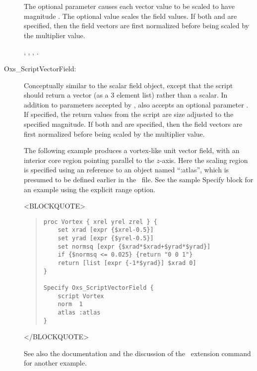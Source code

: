 \begin{description}
   The optional  parameter causes each vector value to be
   scaled to have magnitude .  The optional
    value scales the field values.  If both
    and  are specified, then the field vectors
   are first normalized before being scaled by the multiplier value.

   \begin{ExampleMifs}
     , ,
     , .
   \end{ExampleMifs}

\item[Oxs\_ScriptVectorField:\label{item:ScriptVectorField}]
%
Conceptually similar to the
 scalar
field object,
except that the script should return a vector (as a 3 element list)
rather than a scalar.  In addition to parameters accepted by
,  also accepts
an optional parameter .  If specified, the return
values from the script are size adjusted to the specified magnitude.
If both  and  are specified, then
the field vectors are first normalized before being scaled by the
multiplier value.

The following example produces a vortex-like unit vector field, with
an interior core region pointing parallel to the $z$-axis.  Here the
scaling region is specified using an  reference to an
object named ``:atlas'', which is presumed to be defined earlier in
the \MIF\ file.  See the  sample Specify
block for an example using the explicit range option.
\begin{rawhtml}
<BLOCKQUOTE>
\end{rawhtml}
\begin{quote}
\begin{verbatim}
proc Vortex { xrel yrel zrel } {
    set xrad [expr {$xrel-0.5}]
    set yrad [expr {$yrel-0.5}]
    set normsq [expr {$xrad*$xrad+$yrad*$yrad}]
    if {$normsq <= 0.025} {return "0 0 1"}
    return [list [expr {-1*$yrad}] $xrad 0]
}

Specify Oxs_ScriptVectorField {
    script Vortex
    norm  1
    atlas :atlas
}
\end{verbatim}
\end{quote}
\begin{rawhtml}
</BLOCKQUOTE>
\end{rawhtml}
See also the
documentation and the discussion of the
 \MIF\ extension command
for another  example.


\end{description}
